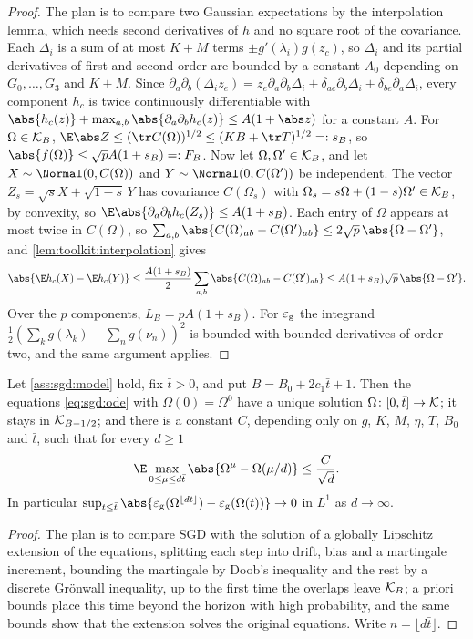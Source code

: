 \begin{refsection}
\begin{proof}
The plan is to compare two Gaussian expectations by the interpolation lemma, which needs second derivatives of $h$ and no square root of the covariance. Each $\Delta_i$ is a sum of at most $K+M$ terms $\pm g'(\lambda_i)g(z_c)$, so $\Delta_i$ and its partial derivatives of first and second order are bounded by a constant $A_0$ depending on $G_0,\dots,G_3$ and $K+M$. Since $\partial_a\partial_b(\Delta_iz_e)=z_e\partial_a\partial_b\Delta_i+\delta_{ae}\partial_b\Delta_i+\delta_{be}\partial_a\Delta_i$, every component $h_c$ is twice continuously differentiable with $\abs{h_c(z)}+\max_{a,b}\abs{\partial_a\partial_bh_c(z)}\le A(1+\abs z)$ for a constant $A$. For $\Omega\in\mathcal K_B$, $\E\abs Z\le(\tr C(\Omega))^{1/2}\le(KB+\tr T)^{1/2}=:s_B$, so $\abs{f(\Omega)}\le\sqrt pA(1+s_B)=:F_B$. Now let $\Omega,\Omega'\in\mathcal K_B$, and let $X\sim\Normal(0,C(\Omega))$ and $Y\sim\Normal(0,C(\Omega'))$ be independent. The vector $Z_s=\sqrt sX+\sqrt{1-s}\,Y$ has covariance $C(\Omega_s)$ with $\Omega_s=s\Omega+(1-s)\Omega'\in\mathcal K_B$, by convexity, so $\E\abs{\partial_a\partial_bh_c(Z_s)}\le A(1+s_B)$. Each entry of $\Omega$ appears at most twice in $C(\Omega)$, so $\sum_{a,b}\abs{C(\Omega)_{ab}-C(\Omega')_{ab}}\le2\sqrt p\,\abs{\Omega-\Omega'}$, and \cref{lem:toolkit:interpolation} gives
\[
\abs{\E h_c(X)-\E h_c(Y)}\le\frac{A(1+s_B)}2\sum_{a,b}\abs{C(\Omega)_{ab}-C(\Omega')_{ab}}\le A(1+s_B)\sqrt p\,\abs{\Omega-\Omega'}.
\]
Over the $p$ components, $L_B=pA(1+s_B)$. For $\varepsilon_{\mathrm g}$ the integrand $\frac12(\sum_kg(\lambda_k)-\sum_ng(\nu_n))^2$ is bounded with bounded derivatives of order two, and the same argument applies.
\end{proof}

\begin{theorem}\label{thm:sgd:ode}
Let \cref{ass:sgd:model} hold, fix $\bar t>0$, and put $B=B_0+2c_1\bar t+1$. Then the equations \eqref{eq:sgd:ode} with $\Omega(0)=\Omega^0$ have a unique solution $\Omega\colon[0,\bar t]\to\mathcal K$; it stays in $\mathcal K_{B-1/2}$; and there is a constant $C$, depending only on $g$, $K$, $M$, $\eta$, $T$, $B_0$ and $\bar t$, such that for every $d\ge1$
\[
\E\max_{0\le\mu\le d\bar t}\abs{\Omega^\mu-\Omega(\mu/d)}\le\frac C{\sqrt d}.
\]
In particular $\sup_{t\le\bar t}\abs{\sgdeg(\Omega^{\lfloor dt\rfloor})-\sgdeg(\Omega(t))}\to0$ in $L^1$ as $d\to\infty$.
\end{theorem}

\begin{proof}
The plan is to compare SGD with the solution of a globally Lipschitz extension of the equations, splitting each step into drift, bias and a martingale increment, bounding the martingale by Doob's inequality and the rest by a discrete Grönwall inequality, up to the first time the overlaps leave $\mathcal K_B$; a priori bounds place this time beyond the horizon with high probability, and the same bounds show that the extension solves the original equations. Write $n=\lfloor d\bar t\rfloor$.


\end{proof}
\end{refsection}
